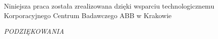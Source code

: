 \documentclass[a4paper, 12pt, twoside]{book}
\renewcommand{\chaptermark}[1]{\markboth{\chaptername\ \thechapter.\ #1}{}}
\renewcommand{\sectionmark}[1]{\markright{\thesection.\ #1}}
\numberwithin{equation}{section}
\begin{document}
\begin{center}
\begin{large}
Niniejsza praca została zrealizowana dzięki wsparciu technologicznemu Korporacyjnego Centrum Badawczego ABB w Krakowie
\end{large}
\end{center}


\clearpage{\pagestyle{empty}\cleardoublepage}
\newpage
{}
\thispagestyle{empty}
\vspace*{15cm} \vfill
\begin{flushright} 
\begin{minipage}[!h]{7.5cm}
{\Large\itshape {PODZIĘKOWANIA}}
\end{minipage}
\end{flushright} 
\pagestyle{fancy}  
\restoregeometry
\clearpage{\pagestyle{empty}\cleardoublepage}

\renewcommand{\figurename}{Rys.} 
\renewcommand{\tablename}{Tab.}
\renewcommand{\listtablename}{Spis tabel}

\tableofcontents
\clearpage{\pagestyle{empty}\cleardoublepage}

\listoffigures
\clearpage{\pagestyle{empty}\cleardoublepage}


\listoftables
\clearpage{\pagestyle{empty}\cleardoublepage}

%



\clearpage{\pagestyle{empty}\cleardoublepage}

\fancyhead{} %
\fancyhead[RO,LE]{\thepage}
\renewcommand{\chaptermark}[1]{\markboth{\chaptername\ \thechapter.\ #1}{}}
\renewcommand{\sectionmark}[1]{\markright{\thesection.\ #1}} 
\fancyhead[LO]{\leftmark}
\fancyhead[RE]{\rightmark}




\clearpage{\pagestyle{empty}\cleardoublepage}
\end{document}
